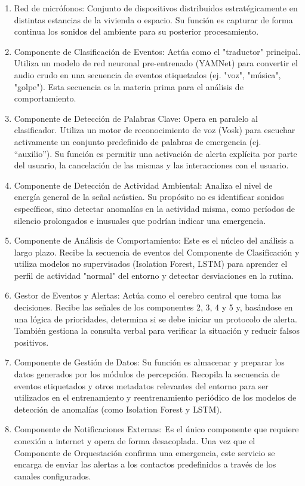 \begin{enumerate}
      \item Red de micrófonos: Conjunto de dispositivos distribuidos estratégicamente en distintas estancias de la vivienda o espacio. Su función es capturar de forma continua los sonidos del ambiente para su posterior procesamiento.
      \item Componente de Clasificación de Eventos: Actúa como el "traductor" principal. Utiliza un modelo de red neuronal pre-entrenado (YAMNet) para convertir el audio crudo en una secuencia de eventos etiquetados (ej. "voz", "música", "golpe"). Esta secuencia es la materia prima para el análisis de comportamiento.
      \item Componente de Detección de Palabras Clave: Opera en paralelo al clasificador. Utiliza un motor de reconocimiento de voz (Vosk) para escuchar activamente un conjunto predefinido de palabras de emergencia (ej. ``auxilio''). Su función es permitir una activación de alerta explícita por parte del usuario, la cancelación de las mismas y las interacciones con el usuario.
      \item Componente de Detección de Actividad Ambiental: Analiza el nivel de energía general de la señal acústica. Su propósito no es identificar sonidos específicos, sino detectar anomalías en la actividad misma, como períodos de silencio prolongados e inusuales que podrían indicar una emergencia.
      \item Componente de Análisis de Comportamiento: Este es el núcleo del análisis a largo plazo. Recibe la secuencia de eventos del Componente de Clasificación y utiliza modelos no supervisados (Isolation Forest, LSTM) para aprender el perfil de actividad "normal" del entorno y detectar desviaciones en la rutina.
      \item Gestor de Eventos y Alertas: Actúa como el cerebro central que toma las decisiones. Recibe las señales de los componentes 2, 3, 4 y 5 y, basándose en una lógica de prioridades, determina si se debe iniciar un protocolo de alerta. También gestiona la consulta verbal para verificar la situación y reducir falsos positivos.
      \item Componente de Gestión de Datos: Su función es almacenar y preparar los datos generados por los módulos de percepción. Recopila la secuencia de eventos etiquetados y otros metadatos relevantes del entorno para ser utilizados en el entrenamiento y reentrenamiento periódico de los modelos de detección de anomalías (como Isolation Forest y LSTM).
      \item Componente de Notificaciones Externas: Es el único componente que requiere conexión a internet y opera de forma desacoplada. Una vez que el Componente de Orquestación confirma una emergencia, este servicio se encarga de enviar las alertas a los contactos predefinidos a través de los canales configurados.
\end{enumerate}

